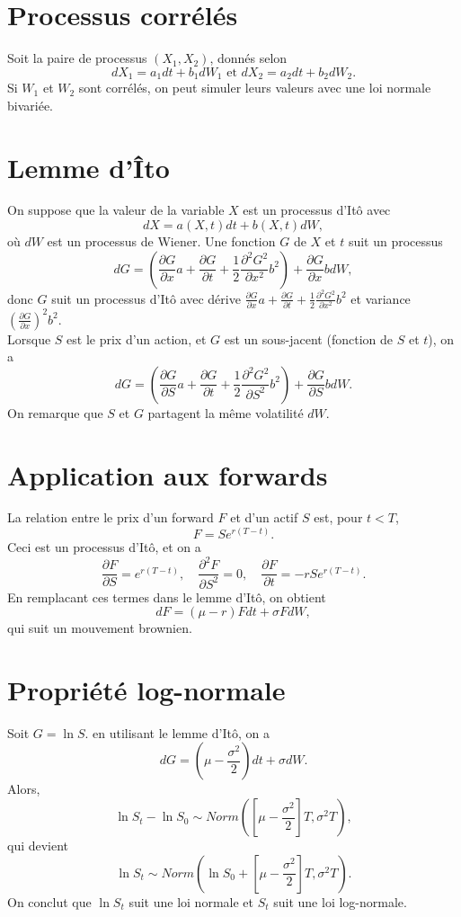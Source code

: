 \section{Processus corrélés}

Soit la paire de processus $(X_1, X_2)$, donnés selon
$$dX_1 = a_1 dt + b_1 dW_1 \text{  et  } dX_2 = a_2 dt + b_2 dW_2.$$
Si $W_1$ et $W_2$ sont corrélés, on peut simuler leurs valeurs avec une loi normale bivariée. 

\section{Lemme d'Îto}

On suppose que la valeur de la variable $X$ est un processus d'Itô avec 
$$dX = a(X, t) dt + b(X, t) dW,$$
où $dW$ est un processus de Wiener. Une fonction $G$ de $X$ et $t$ suit un processus
$$dG = \left(\frac{\partial G}{\partial x} a + \frac{\partial G}{\partial t} + \frac{1}{2} \frac{\partial^2 G^2}{\partial x^2}b^2\right) + \frac{\partial G}{\partial x} b dW,$$
donc $G$ suit un processus d'Itô avec dérive $\frac{\partial G}{\partial x} a + \frac{\partial G}{\partial t} + \frac{1}{2} \frac{\partial^2 G^2}{\partial x^2}b^2$ et variance $\left(\frac{\partial G}{\partial x}\right)^2 b^2.$\\

Lorsque $S$ est le prix d'un action, et $G$ est un sous-jacent (fonction de $S$ et $t$), on a
$$dG = \left(\frac{\partial G}{\partial S} a + \frac{\partial G}{\partial t} + \frac{1}{2} \frac{\partial^2 G^2}{\partial S^2}b^2\right) + \frac{\partial G}{\partial S} b dW.$$
On remarque que $S$ et $G$ partagent la même volatilité $dW$. 

\section{Application aux forwards}

La relation entre le prix d'un forward $F$ et d'un actif $S$ est, pour $t<T$, 
$$F = Se^{r(T-t)}.$$
Ceci est un processus d'Itô, et on a 
$$\frac{\partial F}{\partial S} = e^{r(T-t)}, \quad \frac{\partial^2 F}{\partial S^2} = 0, \quad \frac{\partial F}{\partial t} = -rSe^{r(T-t)}.$$
En remplacant ces termes dans le lemme d'Itô, on obtient
$$dF = (\mu - r) F dt + \sigma F dW,$$
qui suit un mouvement brownien. 

\section{Propriété log-normale}

Soit $G = \ln S$. en utilisant le lemme d'Itô, on a 
$$dG = \left(\mu - \frac{\sigma^2}{2}\right) dt + \sigma dW. $$
Alors, 
$$\ln S_t - \ln S_0 \sim Norm\left(\left[\mu - \frac{\sigma^2}{2}\right]T, \sigma^2 T\right),$$
qui devient
$$\ln S_t\sim Norm\left(\ln S_0 + \left[\mu - \frac{\sigma^2}{2}\right]T, \sigma^2 T\right).$$
On conclut que $\ln S_t$ suit une loi normale et $S_t$ suit une loi log-normale. 

